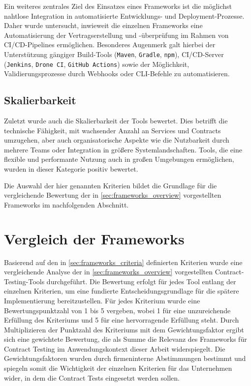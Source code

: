 Ein weiteres zentrales Ziel des Einsatzes eines Frameworks ist die möglichst nahtlose Integration in automatisierte Entwicklungs- und \gls{Deployment}-Prozesse.
Daher wurde untersucht, inwieweit die einzelnen Frameworks eine Automatisierung der Vertragserstellung und -überprüfung im Rahmen von \gls{CI}/\gls{CD}-\glspl{Pipeline} ermöglichen.
Besonderes Augenmerk galt hierbei der Unterstützung gängiger \gls{Build}-Tools (\zB\texttt{\gls{Maven}}, \texttt{\gls{Gradle}},  \texttt{\gls{npm}}), \gls{CI}/\gls{CD}-Server (\zB \texttt{Jenkins}, \texttt{Drone CI}, \texttt{GitHub Actions}) sowie der Möglichkeit, Validierungsprozesse durch Webhooks oder \gls{CLI}-Befehle zu automatisieren.

\subsection{Skalierbarkeit}\label{subsec:frameworks_criterion_scalability}

Zuletzt wurde auch die Skalierbarkeit der Tools bewertet.
Dies betrifft die technische Fähigkeit, mit wachsender Anzahl an Services und Contracts umzugehen, aber auch organisatorische Aspekte wie die Nutzbarkeit durch mehrere Teams oder Integration in größere Systemlandschaften.
Tools, die eine flexible und performante Nutzung auch in großen Umgebungen ermöglichen, wurden in dieser Kategorie positiv bewertet.

Die Auswahl der hier genannten Kriterien bildet die Grundlage für die vergleichende Bewertung der in \cref{sec:frameworks_overview} vorgestellten Frameworks im nachfolgenden Abschnitt.

\section{Vergleich der Frameworks}\label{sec:frameworks_comparison}

Basierend auf den in \cref{sec:frameworks_criteria} definierten Kriterien wurde eine vergleichende Analyse der in \cref{sec:frameworks_overview} vorgestellten Contract-Testing-Tools durchgeführt.
Die Bewertung erfolgt für jedes Tool entlang der einzelnen Kriterien, um eine fundierte Entscheidungsgrundlage für die spätere Implementierung bereitzustellen.
Für jedes Kriterium wurde eine Bewertungspunktzahl von 1 bis 5 vergeben, wobei 1 für eine unzureichende Erfüllung des Kriteriums und 5 für eine hervorragende Erfüllung steht.
Durch Multiplizieren der Punktzahl des Kriteriums mit dem Gewichtungsfaktor ergibt sich eine gewichtete Bewertung, die als Summe die Relevanz des Frameworks für Contract Testing im Anwendungskontext dieser Arbeit widerspiegelt.
Die Gewichtungsfaktoren wurden durch firmeninterne Abstimmungen bestimmt und spiegeln somit die Wichtigkeit der einzelnen Kriterien für das Unternehmen wider, in dem die Contract Tests eingesetzt werden sollen.

